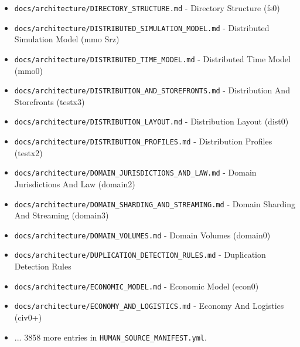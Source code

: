\documentclass[10.5pt,a4paper,openany]{book}
\begin{document}
\begin{itemize}
\item \texttt{docs/\allowbreak{}architecture/\allowbreak{}DIRECTORY\_\allowbreak{}STRUCTURE.\allowbreak{}md} -\allowbreak{} Directory Structure (fs0)
\item \texttt{docs/\allowbreak{}architecture/\allowbreak{}DISTRIBUTED\_\allowbreak{}SIMULATION\_\allowbreak{}MODEL.\allowbreak{}md} -\allowbreak{} Distributed Simulation Model (mmo Srz)
\item \texttt{docs/\allowbreak{}architecture/\allowbreak{}DISTRIBUTED\_\allowbreak{}TIME\_\allowbreak{}MODEL.\allowbreak{}md} -\allowbreak{} Distributed Time Model (mmo0)
\item \texttt{docs/\allowbreak{}architecture/\allowbreak{}DISTRIBUTION\_\allowbreak{}AND\_\allowbreak{}STOREFRONTS.\allowbreak{}md} -\allowbreak{} Distribution And Storefronts (testx3)
\item \texttt{docs/\allowbreak{}architecture/\allowbreak{}DISTRIBUTION\_\allowbreak{}LAYOUT.\allowbreak{}md} -\allowbreak{} Distribution Layout (dist0)
\item \texttt{docs/\allowbreak{}architecture/\allowbreak{}DISTRIBUTION\_\allowbreak{}PROFILES.\allowbreak{}md} -\allowbreak{} Distribution Profiles (testx2)
\item \texttt{docs/\allowbreak{}architecture/\allowbreak{}DOMAIN\_\allowbreak{}JURISDICTIONS\_\allowbreak{}AND\_\allowbreak{}LAW.\allowbreak{}md} -\allowbreak{} Domain Jurisdictions And Law (domain2)
\item \texttt{docs/\allowbreak{}architecture/\allowbreak{}DOMAIN\_\allowbreak{}SHARDING\_\allowbreak{}AND\_\allowbreak{}STREAMING.\allowbreak{}md} -\allowbreak{} Domain Sharding And Streaming (domain3)
\item \texttt{docs/\allowbreak{}architecture/\allowbreak{}DOMAIN\_\allowbreak{}VOLUMES.\allowbreak{}md} -\allowbreak{} Domain Volumes (domain0)
\item \texttt{docs/\allowbreak{}architecture/\allowbreak{}DUPLICATION\_\allowbreak{}DETECTION\_\allowbreak{}RULES.\allowbreak{}md} -\allowbreak{} Duplication Detection Rules
\item \texttt{docs/\allowbreak{}architecture/\allowbreak{}ECONOMIC\_\allowbreak{}MODEL.\allowbreak{}md} -\allowbreak{} Economic Model (econ0)
\item \texttt{docs/\allowbreak{}architecture/\allowbreak{}ECONOMY\_\allowbreak{}AND\_\allowbreak{}LOGISTICS.\allowbreak{}md} -\allowbreak{} Economy And Logistics (civ0+)
\item .\allowbreak{}.\allowbreak{}.\allowbreak{} 3858 more entries in \texttt{HUMAN\_\allowbreak{}SOURCE\_\allowbreak{}MANIFEST.\allowbreak{}yml}.\allowbreak{}
\end{itemize}
\end{document}

